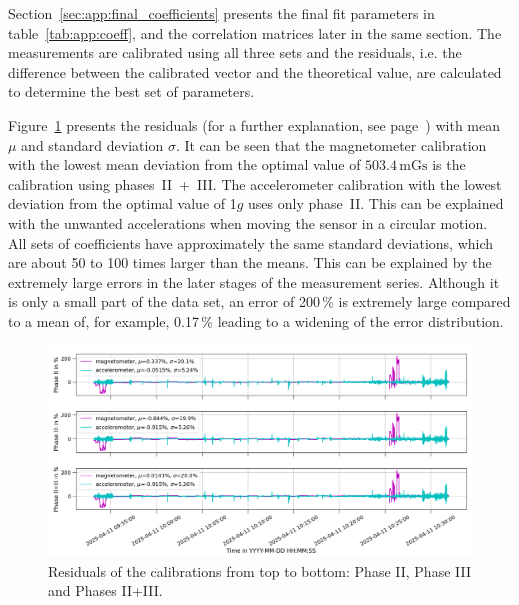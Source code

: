 Section~\ref{sec:app:final_coefficients} presents the final fit parameters in table~\ref{tab:app:coeff}, and the correlation matrices later in the same section. The measurements are calibrated using all three sets and the residuals, i.e. the difference between the calibrated vector and the theoretical value, are calculated to determine the best set of parameters. 

Figure~\ref{fig:res:residuals} presents the residuals (for a further explanation, see page~\pageref{eq:residuals}) with mean $\mu$ and standard deviation $\sigma$. It can be seen that the magnetometer calibration with the lowest mean deviation from the optimal value of $503.4\,\mathrm{mGs}$ is the calibration using phases~II~+~III. The accelerometer calibration with the lowest deviation from the optimal value of 1$g$ uses only phase~II. This can be explained with the unwanted accelerations when moving the sensor in a circular motion.\\
All sets of coefficients have approximately the same standard deviations, which are about 50 to 100 times larger than the means. This can be explained by the extremely large errors in the later stages of the measurement series. Although it is only a small part of the data set, an error of 200\,\% is extremely large compared to a mean of, for example, 0.17\,\% leading to a widening of the error distribution.
\begin{figure}[H]
    \centering
    \includegraphics[width=\linewidth]{images/04_calibration/residuals_mag_acc_calibrations.png}
    \caption[Residuals of the calibrations.]{Residuals of the calibrations from top to bottom: Phase II, Phase III and Phases II+III.}
    \label{fig:res:residuals}
\end{figure}

